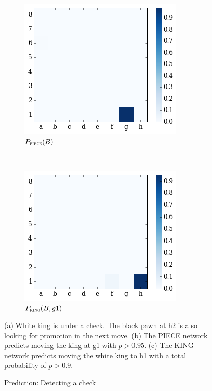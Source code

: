 \begin{figure}[H]
 \hspace*{-0.5in}  
    \begin{subfigure}[t]{0.5\textwidth}
        \centering
        \includegraphics[width=\textwidth]{img/best_moves/output_24_2.png}
        \caption{$P_{\textsc{piece}}(B)$}
    \end{subfigure}
    ~
  \centering
    \begin{subfigure}[t]{0.5\textwidth}
        \centering
        \includegraphics[width=\textwidth]{img/best_moves/output_24_6.png}
        \caption{$P_{\textsc{king}}(B, g1)$}
    \end{subfigure}%
    \caption{Prediction: Detecting a check}
    \small
    \justifying
    (a) White king is under a check. The black pawn at h2 is 
also looking for promotion in the next move. (b) The \textsc{PIECE} network 
predicts moving the king at g1 with $p>0.95$. (c) The \textsc{KING} network 
predicts moving the white king to h1 with a total probability of $p>0.9$.
\label{figure:check-detection}
\end{figure}

